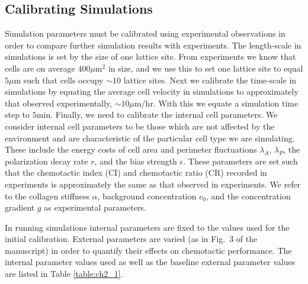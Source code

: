 \subsection{Calibrating Simulations}

Simulation parameters must be calibrated using experimental observations in order to compare further simulation results with experiments. The length-scale in simulations is set by the size of one lattice site. From experiments we know that cells are on average $400 \mu\text{m}^2$ in size, and we use this to set one lattice site to equal $5 \mu\text{m}$ such that cells occupy $\sim 10$ lattice sites. Next we calibrate the time-scale in simulations by equating the average cell velocity in simulations to approximately that observed experimentally, $\sim 10 \mu\text{m/hr}$. With this we equate a simulation time step to $5 \text{min}$. Finally, we need to calibrate the internal cell parameters. We consider internal cell parameters to be those which are not affected by the environment and are characteristic of the particular cell type we are simulating.
These include the energy costs of cell area and perimeter fluctuations $\lambda_A$, $\lambda_P$, the polarization decay rate $r$, and the bias strength $\epsilon$. These parameters are set such that the chemotactic index (CI) and chemotactic ratio (CR) recorded in experiments is approximately the same as that observed in experiments. We refer to the collagen stiffness $\alpha$, background concentration $c_0$, and the concentration gradient $g$ as experimental parameters.

In running simulations internal parameters are fixed to the values used for the initial calibration. External parameters are varied (as in Fig.\ 3 of the manuscript) in order to quantify their effects on chemotactic performance. The internal parameter values used as well as the baseline external parameter values are listed in Table \ref{table:ch2_1}.

